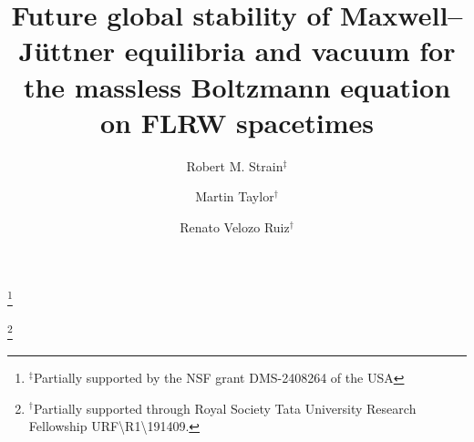 \documentclass[reqno]{amsart}
\theoremstyle{definition}
\numberwithin{equation}{section}
\numberwithin{theorem}{section}
\begin{document}



\title[Global stability of the massless Boltzmann equation on FLRW]{Future global stability of Maxwell--J{\"u}ttner equilibria and vacuum for the massless Boltzmann equation on FLRW spacetimes} 

\author[R. M. Strain]{Robert M. Strain$^{\ddagger}$}
\address{$^\ddagger$Department of Mathematics, University of Pennsylvania, Philadelphia, PA 19104, USA. \href{mailto:strain@math.upenn.edu}{strain@math.upenn.edu} ( \href{https://orcid.org/0000-0002-1107-8570}{https://orcid.org/0000-0002-1107-8570})}
\thanks{$^\ddagger$Partially supported by the NSF grant DMS-2408264 of the USA}


\author[M. Taylor]{Martin Taylor$^{\dagger}$}
\author[R. Velozo Ruiz]{Renato Velozo Ruiz$^{\dagger}$}
\address{$^\dagger$Imperial College London,
Department of Mathematics,
South~Kensington~Campus,~London~SW7~2AZ,~United~Kingdom. \href{mailto:martin.taylor@imperial.ac.uk}{martin.taylor@imperial.ac.uk} ( \href{https://orcid.org/0000-0001-5747-5267}{https://orcid.org/0000-0001-5747-5267}), \href{mailto:r.velozoruiz@imperial.ac.uk}{r.velozoruiz@imperial.ac.uk} ( \href{https://orcid.org/0009-0002-5337-2118}{https://orcid.org/0009-0002-5337-2118}).}
\thanks{$^\dagger$Partially supported through Royal Society Tata University Research Fellowship URF\textbackslash R1\textbackslash191409.}
\end{document}
